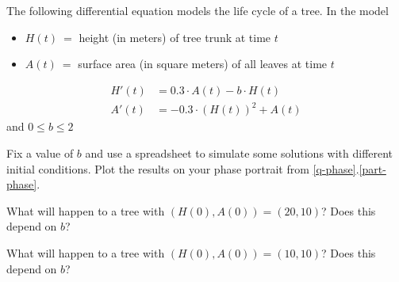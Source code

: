 \documentclass{workbook}
\begin{document}
\begin{slide}
	\question
	The following differential equation models the life cycle of a tree.
	In the model
	\begin{itemize}
		\item $H(t)\ =$ height (in meters) of tree trunk at time $t$
		\item $A(t)\ =$ surface area (in square meters) of all leaves at time $t$
	\end{itemize}
	\begin{align*}
		H'(t) &= 0.3\cdot A(t)-b\cdot H(t)\\
		A'(t) &= -0.3\cdot (H(t))^2 + A(t)
	\end{align*}
	and $0 \leq b \leq 2$

	\bigskip
	\phantom{x}
	\begin{parts}
		\item Fix a value of $b$ and use a spreadsheet to simulate some solutions with different initial conditions.
		Plot the results on your phase portrait from \ref{q-phase}.\ref{part-phase}.
		\item What will happen to a tree with $(H(0), A(0))=(20,10)$? Does this depend on $b$?
		\item What will happen to a tree with $(H(0), A(0))=(10,10)$? Does this depend on $b$?
	\end{parts}
	\bigskip
	\phantom{x}
\end{slide}
\end{document}
